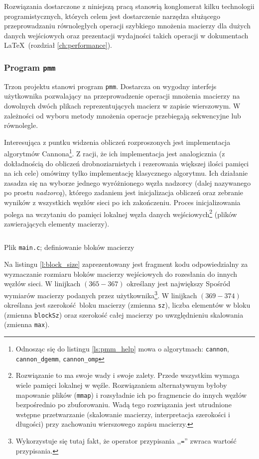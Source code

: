 Rozwiązania dostarczone z niniejszą pracą stanowią konglomerat kilku technologii programistycznych, których celem jest dostarczenie narzędza służącego przeprowadzaniu równoległych operacji szybkiego mnożenia macierzy dla dużych danych wejściowych oraz prezentacji wydajności takich operacji w dokumentach \LaTeX \, (rozdział \ref{ch:performance}). 

\subsubsection{Program \texttt{pmm}}

Trzon projektu stanowi program \texttt{pmm}. Dostarcza on wygodny interfejs użytkownika pozwalający na przeprowadzenie operacji mnożenia macierzy na dowolnych dwóch plikach reprezentujących macierz w zapisie wierszowym. W zależności od wyboru metody mnożenia operacje przebiegają sekwencyjne lub równolegle.

Interesująca z puntku widzenia obliczeń rozproszonych jest implementacja algorytmów Cannona\footnote{Odnosząc się do listingu \ref{ls:pmm_help} mowa o algorytmach: \texttt{cannon}, \texttt{cannon\_dgemm}, \texttt{cannon\_omp}}. Z racji, że ich implementacja jest analogicznia (z dokładnością do obliczeń drobnoziarnistych i rezerowania większej ilości pamięci na ich cele) omówimy tylko implementację klasycznego algorytmu. Ich działanie zasadza się na wyborze jednego wyróżnionego węzła nadzorcy (dalej nazywanego po prostu \emph{nadzorcą}), którego zadaniem jest inicjalizacja obliczeń oraz zebranie wyników z wszystkich węzłów sieci po ich zakończeniu. Proces inicjalizowania polega na wczytaniu do pamięci lokalnej węzła danych wejściowych\footnote{Rozwiązanie to ma swoje wady i swoje zalety. Przede wszystkim wymaga wiele pamięci lokalnej w węźle. Rozwiązaniem alternatywnym byłoby mapowanie plików (\texttt{mmap}) i rozsyładnie ich po fragmencie do innych węzłów bezpośrednio po zbuforowaniu. Wadą tego rozwiązania jest utrudnione wstępne przetwarzanie (skalowanie macierzy, interpretacja szerokości i długości) przy zachowaniu wierszowego zapisu macierzy.} (plików zawierających elementy macierzy). 

\begin{listing}[H]
\inputminted[fontsize=\footnotesize,bgcolor=bg,linenos,firstnumber=365,firstline=365,lastline=377]{c}{includes/listings/main.c}
\caption{Plik \texttt{main.c}; definiowanie bloków macierzy}
\label{l:block_size}
\end{listing}

Na listingu \ref{l:block_size} zaprezentowany jest fragment kodu odpowiedzialny za wyznaczanie rozmiaru bloków macierzy wejściowych do rozesłania do innych węzłów sieci. W linijkach \((365-367)\) określany jest największy Spośród wymiarów macierzy podanych przez użytkownika\footnote{Wykorzystuje się tutaj fakt, że operator przypisania ,,\texttt{=}'' zwraca wartość przypisania.}. W linijkach \((369-374)\) określana jest szerokość bloku macierzy (zmienna \texttt{sz}), liczba elementów w bloku (zmienna \texttt{blockSz}) oraz szerokość całej macierzy po uwzględnieniu skalowania (zmienna \texttt{max}).

